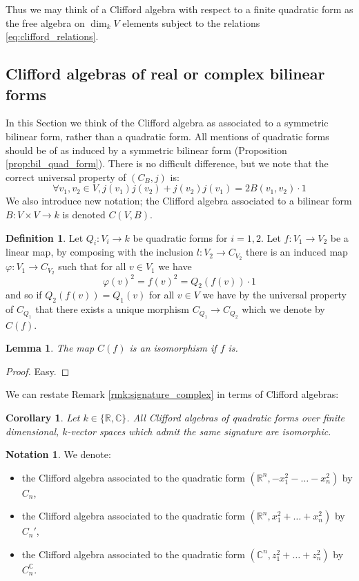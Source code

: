 \documentclass[12pt]{article}
\theoremstyle{plain}
\newtheorem{lemma}[thm]{Lemma}
\newtheorem{cor}[thm]{Corollary}
\theoremstyle{definition}
\newtheorem{defn}[thm]{Definition} %
\newtheorem{notation}[thm]{Notation}
\newcommand{\bb}[1]{\mathbb{#1}}
\newcommand{\lto}{\longrightarrow}
\begin{document}
	Thus we may think of a Clifford algebra with respect to a finite quadratic form as the free algebra on $\operatorname{dim}_kV$ elements subject to the relations \eqref{eq:clifford_relations}.
	
	\subsection{Clifford algebras of real or complex bilinear forms}
	In this Section we think of the Clifford algebra as associated to a symmetric bilinear form, rather than a quadratic form.  All mentions of quadratic forms should be of as induced by a symmetric bilinear form (Proposition \ref{prop:bil_quad_form}). There is no difficult difference, but we note that the correct universal property of $(C_B,j)$ is:
	\begin{equation}
		\forall v_1,v_2 \in V, j(v_1)j(v_2) + j(v_2)j(v_1) = 2B(v_1,v_2)\cdot 1
	\end{equation}
	We also introduce new notation; the Clifford algebra associated to a bilinear form $B: V \times V \lto k$ is denoted $C(V,B)$.
	\begin{defn}
		Let $Q_i: V_i \lto k$ be quadratic forms for $i = 1,2$. Let $f: V_1 \lto V_2$ be a linear map, by composing with the inclusion $l: V_2 \lto C_{V_2}$ there is an induced map $\varphi: V_1 \lto C_{V_2}$ such that for all $v \in V_1$ we have
		\begin{equation}
			\varphi(v)^2 = f(v)^2 = Q_2(f(v))\cdot 1
		\end{equation}
		and so if $Q_2(f(v)) = Q_1(v)$ for all $v \in V$ we have by the universal property of $C_{Q_1}$ that there exists a unique morphism $C_{Q_1} \lto C_{Q_2}$ which we denote by $C(f)$.
	\end{defn}
	\begin{lemma}
		The map $C(f)$ is an isomorphism if $f$ is.
	\end{lemma}
	\begin{proof}
		Easy.
	\end{proof}
	We can restate Remark \ref{rmk:signature_complex} in terms of Clifford algebras:
	\begin{cor}\label{cor:signature_determines}
		Let $k\in \lbrace \bb{R},\bb{C}\rbrace$. All Clifford algebras of quadratic forms over finite dimensional, $k$-vector spaces which admit the same signature are isomorphic.
	\end{cor}
	\begin{notation}
		We denote:
		\begin{itemize}
			\item the Clifford algebra associated to the quadratic form $(\bb{R}^n, -x_1^2 - \hdots - x_n^2)$ by $C_n$,
			\item the Clifford algebra associated to the quadratic form $(\bb{R}^n, x_1^2 + \hdots + x_n^2)$ by $C_n'$,
			\item the Clifford algebra associated to the quadratic form $(\bb{C}^n, z_1^2 + \hdots + z_n^2)$ by $C_n^{\bb{C}}$.
		\end{itemize}
	\end{notation}
\end{document}
